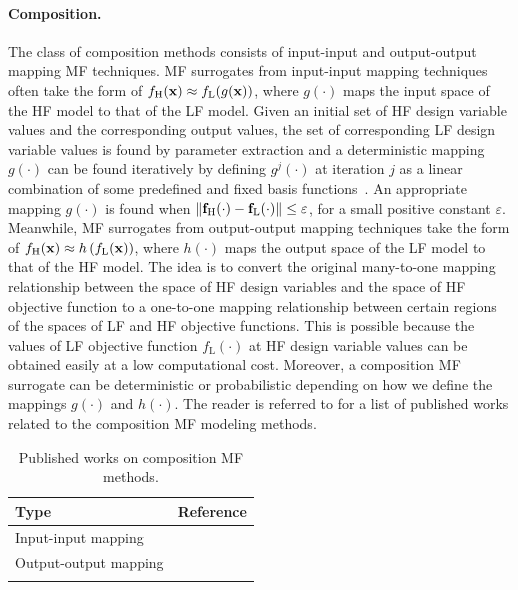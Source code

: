 \documentclass[journal ]{new-aiaa}
\newcommand{\edit}[1]{\textcolor{red}{#1}} %
\begin{document}
\paragraph{Composition.}
The class of composition methods consists of input-input and output-output mapping MF techniques.
MF surrogates from input-input mapping techniques often take the form of
{$f_\text{H}({\bf x}) \approx f_\text{L}(g({\bf x}))$,
  where
  $g(\cdot)$ maps the input space of the HF model to that of the LF model.}
Given an initial set of HF design variable values and the corresponding output values, the set of corresponding LF design variable values is found by parameter extraction and a deterministic mapping $g(\cdot)$ can be found iteratively by defining  $g^j(\cdot)$ at iteration $j$ as a linear combination of some predefined and fixed basis functions~\citep{Bandler1994}.
An appropriate mapping $g(\cdot)$ is found when $\| {\bf f}_\text{H}(\cdot) - {\bf f}_\text{L}(\cdot)\| \leq \varepsilon$, for a small positive constant $\varepsilon$. 
Meanwhile, MF surrogates from output-output mapping techniques take the form of
{$f_\text{H}({\bf x}) \approx h\left(f_\text{L}({\bf x})\right)$,
  where $h(\cdot)$ maps the output space of the LF model to that of the HF model.}
The idea is to convert the original many-to-one mapping relationship between the space of HF design variables and the space of HF objective function to a one-to-one mapping relationship between certain regions of the spaces of LF and HF objective functions. 
This is possible because the values of LF objective function $f_\text{L}(\cdot)$ at HF design variable values can be obtained easily at a low computational cost.
Moreover, a composition MF surrogate can be deterministic or probabilistic depending on how we define the mappings $g(\cdot)$ and $h(\cdot)$.
The reader is referred to  for a list of published works related to the composition MF modeling methods.

\begin{table}
	\caption{Published works on composition MF methods.}
	\label{Table3}
	\centering
	\begin{tabularx}{\textwidth}{lX}
		\hline \noalign{\smallskip}
		Type & Reference\\
		\hline \noalign{\smallskip}
		Input-input mapping & \citet{Bandler1994,Bandler2004,Koziel2006,Robinson2008,TaoSiyu2019} \\
		\noalign{\smallskip}
		Output-output mapping &  \citet{Zheng2014,Zhou2017aei,Perdikaris2017,Jiang2018,Cutajar2019,Hebbal2021smo,Li2023}   \\
		\hline \noalign{\smallskip}
	\end{tabularx}
\end{table}
\end{document}
